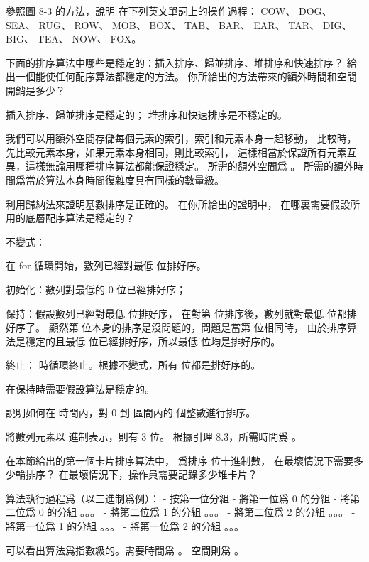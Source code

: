 \startsection[
  title={Radix sort},
]

\startEXERCISE
參照圖 8-3 的方法，說明  在下列英文單詞上的操作過程：
 COW、 DOG、 SEA、 RUG、 ROW、 MOB、 BOX、 TAB、 BAR、 EAR、 TAR、 DIG、 BIG、 TEA、 NOW、 FOX。
\stopEXERCISE

\startANSWER
\leavevmode
\externalfigure[output/e8_2_2-1]
\externalfigure[output/e8_2_2-2]
\externalfigure[output/e8_2_2-3]
\externalfigure[output/e8_2_2-4]
\stopANSWER

\startEXERCISE
下面的排序算法中哪些是穩定的：插入排序、歸並排序、堆排序和快速排序？
給出一個能使任何配序算法都穩定的方法。
你所給出的方法帶來的額外時間和空間開銷是多少？
\stopEXERCISE

\startANSWER
插入排序、歸並排序是穩定的； 堆排序和快速排序是不穩定的。

我們可以用額外空間存儲每個元素的索引，索引和元素本身一起移動，
比較時，先比較元素本身，如果元素本身相同，則比較索引，
這樣相當於保證所有元素互異，這樣無論用哪種排序算法都能保證穩定。
所需的額外空間爲 。
所需的額外時間爲當於算法本身時間復雜度具有同樣的數量級。
\stopANSWER

\startEXERCISE
利用歸納法來證明基數排序是正確的。
在你所給出的證明中，
在哪裏需要假設所用的底層配序算法是穩定的？
\stopEXERCISE

\startANSWER
不變式：

{\EMP 在 for 循環開始，數列已經對最低  位排好序。}

{\EMP 初始化：}數列對最低的 0 位已經排好序；

{\EMP 保持：}假設數列已經對最低  位排好序，
在對第  位排序後，數列就對最低  位都排好序了。
顯然第  位本身的排序是沒問題的，問題是當第  位相同時，
由於排序算法是穩定的且最低  位已經排好序，所以最低  位均是排好序的。

{\EMP 終止：}  時循環終止。根據不變式，所有  位都是排好序的。

在{\EMP 保持}時需要假設算法是穩定的。
\stopANSWER

\startEXERCISE
說明如何在  時間內，對 0 到  區間內的  個整數進行排序。
\stopEXERCISE

\startANSWER
將數列元素以  進制表示，則有 3 位。
根據{\EMP 引理 8.3}，所需時間爲 。
\stopANSWER

\startEXERCISE\DIFFICULT
在本節給出的第一個卡片排序算法中，
爲排序  位十進制數，
在最壞情況下需要多少輪排序？
在最壞情況下，操作員需要記錄多少堆卡片？
\stopEXERCISE

\startANSWER
算法執行過程爲（以三進制爲例）：
\startCLRS
- 按第一位分組
  - 將第一位爲 0 的分組
    - 將第二位爲 0 的分組
      。。。
    - 將第二位爲 1 的分組
      。。。
    - 將第二位爲 2 的分組
      。。。
  - 將第一位爲 1 的分組
    。。。
  - 將第一位爲 2 的分組
    。。。
\stopCLRS

可以看出算法爲指數級的。需要時間爲 。
空間則爲 。
\stopANSWER

\stopsection
